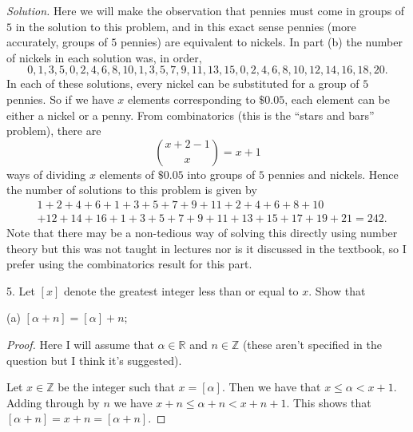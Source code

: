 \documentclass{article}
\newcommand{\R}{\mathbb{R}}
\newcommand{\Z}{\mathbb{Z}}
\begin{document}
\textit{Solution.}
Here we will make the observation that pennies must come in groups of
$5$ in the solution to this problem, and in this exact sense pennies
(more accurately, groups of $5$ pennies) are equivalent to nickels. In
part (b) the number of nickels in each solution was, in order,
%
\begin{equation*}
    0, 1, 3, 5, 0, 2, 4, 6, 8, 10, 1, 3, 5, 7, 9, 11, 13, 15, 0, 2, 4, 6, 8, 10, 12, 14, 16, 18, 20
    .
\end{equation*}
%
In each of these solutions, every nickel can be substituted for a group
of $5$ pennies. So if we have $x$ elements corresponding to $\$0.05$, each
element can be either a nickel or a penny. From combinatorics (this is
the ``stars and bars'' problem), there are
%
\begin{equation*}
    \binom{x + 2 - 1}{x} = x + 1
\end{equation*}
%
ways of dividing $x$ elements of $\$0.05$ into groups of $5$ pennies and
nickels. Hence the number of solutions to this problem is given by
%
\begin{align*}
    &1
    + 2
    + 4
    + 6
    + 1
    + 3
    + 5
    + 7
    + 9
    + 11
    + 2
    + 4
    + 6
    + 8
    + 10
    \\
    &+ 12
    + 14
    + 16
    + 1
    + 3
    + 5
    + 7
    + 9
    + 11
    + 13
    + 15
    + 17
    + 19
    + 21
    = 242
    .
\end{align*}
%
Note that there may be a non-tedious way of solving this directly using
number theory but this was not taught in lectures nor is it discussed in
the textbook, so I prefer using the combinatorics result for this part.

\newpage

5. Let $[x]$ denote the greatest integer less than or equal to $x$. Show that

(a) $[\alpha + n] = [\alpha] + n$;

\begin{proof}

Here I will assume that $\alpha \in \R$ and $n \in \Z$ (these aren't
specified in the question but I think it's suggested).

Let $x \in \Z$ be the integer such that $x = [\alpha]$. Then we have
that $x \leq \alpha < x + 1$. Adding through by $n$ we have $x + n \leq
\alpha + n < x + n + 1$. This shows that $[\alpha + n] = x + n = [\alpha
+ n]$.

\end{proof}
\end{document}
